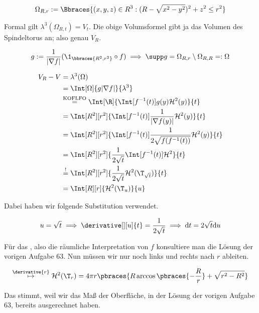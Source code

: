 \begin{solution}

\begin{align*}
    \Omega_{R, r}
    :=
    \Bbraces
    {
        (x, y, z) \in R^3:
        (R - \sqrt{x^2 - y^2})^2 + z^2 \leq r^2
    }
\end{align*}

Formal gilt $\lambda^3(\Omega_{R, t}) = V_t$.
Die obige Volumsformel gibt ja das Volumen des Spindeltorus an; also genau $V_R$.

\begin{align*}
    g := \frac{1}{|\nabla f|} (\1_\bbraces{R^2, r^2} \circ f)
    \implies
    \supp g = \Omega_{R, r} \setminus \Omega_{R, R} =: \Omega
\end{align*}

\begin{align*}
    V_R - V
    & =
    \lambda^3(\Omega) \\
    & =
    \Int[\Omega]
    {
        g |\nabla f|
    }{\lambda^3} \\
    & \stackrel
    {
        \text{KOFLFO}
    }{=}
    \Int[\R]
    {
        \Int[f^{-1}(t)]
        {
            g(y)
        }{\mathcal{H}^2(y)}
    }{t} \\
    & =
    \Int[R^2][r^2]
    {
        \Int[f^{-1}(t)]
        {
            \frac{1}{|\nabla f(y)|}
        }{\mathcal{H}^2(y)}
    }{t} \\
    & =
    \Int[R^2][r^2]
    {
        \Int[f^{-1}(t)]
        {
            \frac{1}{2 \sqrt{f(f^{-1}(t))}}
        }{\mathcal{H}^2(y)}
    }{t} \\
    & =
    \Int[R^2][r^2]
    {
        \frac{1}{2 \sqrt t}
        \Int[f^{-1}(t)]{}{\mathcal{H}^2}
    }{t} \\
    & \stackrel{!}{=}
    \Int[R^2][r^2]
    {
        \frac{1}{2 \sqrt t}
        \mathcal{H}^2(\T_{\sqrt{t}})
    }{t} \\
    & =
    \Int[R][r]
    {
        \mathcal{H}^2(\T_u)
    }{u}
\end{align*}

Dabei haben wir folgende Substitution verwendet.

\begin{align*}
    u = \sqrt t
    \implies
    \derivative[][u]{t} = \frac{1}{2 \sqrt t} \implies \mathrm{d} t = 2 \sqrt t \mathrm{d} u
\end{align*}

Für das \Quote{!}, also die räumliche Interpretation von $f$ konsultiere man die Lösung der vorigen Aufgabe 63.
Nun müssen wir nur noch links und rechts nach $r$ ableiten.

\begin{align*}
    \stackrel
    {
        \derivative{r}
    }{\mapsto}
    \mathcal{H}^2(\T_r)
    =
    4 \pi r
    \pbraces
    {
        R
        \arccos \pbraces{-\frac{R}{r}}
        +
        \sqrt{r^2 - R^2}
    }
\end{align*}

Das stimmt, weil wir das Maß der Oberfläche, in der Lösung der vorigen Aufgabe 63, bereits ausgerechnet haben.

\end{solution}

